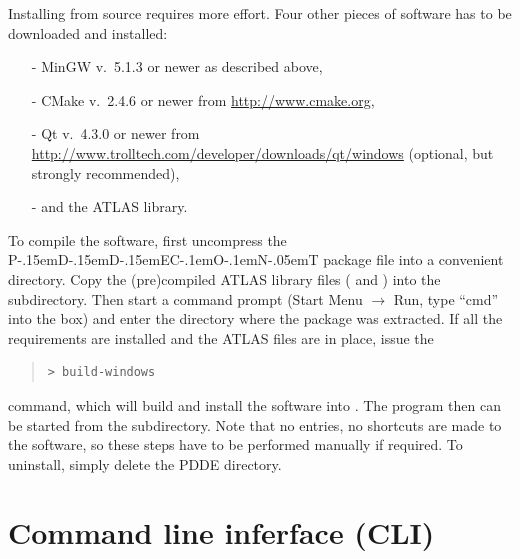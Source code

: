 \documentclass[10pt,a4paper]{ddedoc}
\def\pdde{{P\kern-.15emD\kern-.15emD\kern-.15emE\raisebox{.25ex}{-}C\kern-.1emO\kern-.1emN\kern-.05emT}}
\begin{document}
Installing from source requires more effort. Four other pieces of software has
to be downloaded and installed:
\begin{itemize}
\item[-] MinGW v.\ 5.1.3 or newer as described above,
\item[-] CMake v.\ 2.4.6 or newer from \url{http://www.cmake.org},
\item[-] Qt v.\ 4.3.0 or newer from
\url{http://www.trolltech.com/developer/downloads/qt/windows} (optional, but strongly recommended),
\item[-] and the ATLAS library.
\end{itemize}
To compile the software, first uncompress the \pdde{} package file
 into a convenient directory.
Copy the (pre)compiled ATLAS library files ( and
) into the  subdirectory.
Then start a command prompt (Start Menu $\rightarrow$ Run, type ``cmd'' into the
box) and enter the directory  where the package was
extracted. If all the requirements are installed and the ATLAS files are in
place, issue the
{ \small \begin{quote} \begin{lstlisting}[basicstyle=\tt,frame=single]
 > build-windows
\end{lstlisting} \end{quote} } \noindent
command, which will build and install the software into . The program then can be started from the 
subdirectory. Note that no  entries, no shortcuts are made to
the software, so these steps have to be performed manually if required. To
uninstall, simply delete the PDDE directory.

\section{Command line inferface (CLI)}
\end{document}
